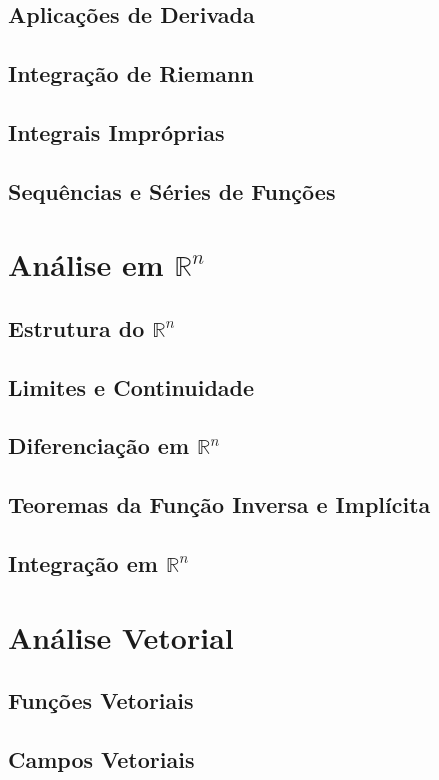 \documentclass[a5paper, 12pt]{book}
\begin{document}
\chapter{Aplicações de Derivada}
\chapter{Integração de Riemann}
\chapter{Integrais Impróprias}
\chapter{Sequências e Séries de Funções}

\part{Análise em $\mathbb{R}^n$}

\chapter{Estrutura do $\mathbb{R}^n$}
\chapter{Limites e Continuidade}
\chapter{Diferenciação em $\mathbb{R}^n$}
\chapter{Teoremas da Função Inversa e Implícita}
\chapter{Integração em $\mathbb{R}^n$}

\part{Análise Vetorial}

\chapter{Funções Vetoriais}
\chapter{Campos Vetoriais}
\end{document}
